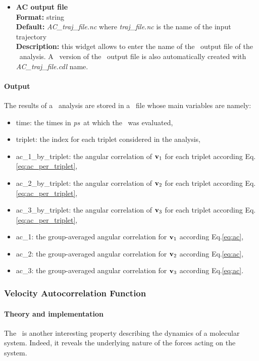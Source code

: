 \documentclass[a4paper,11pt]{report}
\newcommand{\ps}{\textit{ps}}
\begin{document}
\begin{itemize}
\item \textbf{AC output file}\\
\textbf{Format:} string\\
\textbf{Default:} \textit{AC\_traj\_file.nc} where \textit{traj\_file.nc} is the name of the input trajectory\\
\textbf{Description:} this widget allows to enter the name of the \NetCDF\ output file of the \AC\ analysis. A \CDL\ 
version of the \NetCDF\ output file is also automatically created with \textit{AC\_traj\_file.cdl} name.
\end{itemize}
\newpage
\paragraph{Output\\}
The results of a \AC\ analysis are stored in a \NetCDF\ file whose main variables are namely:
\begin{itemize}
\item time: the times in \ps\ at which the \AC\ was evaluated,
\item triplet: the index for each triplet considered in the analysis,
\item ac\_1\_by\_triplet: the angular correlation of ${\bf v}_1$ for each triplet according Eq.\ref{eq:ac_per_triplet},
\item ac\_2\_by\_triplet: the angular correlation of ${\bf v}_2$ for each triplet according Eq.\ref{eq:ac_per_triplet},
\item ac\_3\_by\_triplet: the angular correlation of ${\bf v}_3$ for each triplet according Eq.\ref{eq:ac_per_triplet},
\item ac\_1: the group-averaged angular correlation for ${\bf v}_1$ according Eq.\ref{eq:ac},
\item ac\_2: the group-averaged angular correlation for ${\bf v}_2$ according Eq.\ref{eq:ac},
\item ac\_3: the group-averaged angular correlation for ${\bf v}_3$ according Eq.\ref{eq:ac}.
\end{itemize}

\subsubsection{Velocity Autocorrelation Function}
\label{vacf}
\paragraph{Theory and implementation\\}
\label{vacf_theory}
The \VACF\ is another interesting property describing the dynamics of a 
molecular system. Indeed, it reveals the underlying nature of the forces acting on the system. 
\end{document}
